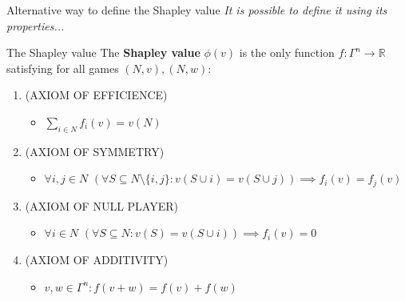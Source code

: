 \documentclass{beamer}
\begin{document}
\begin{frame}{Alternative way to define the Shapley value}
    \textit{It is possible to define it using its properties...}
    \begin{block}{The Shapley value}
       The \textbf{Shapley value} $\phi(v)$ is the only function $f \colon \Gamma^n \to \mathbb{R}$ satisfying for all games $(N,v),(N,w)$:
        \begin{enumerate}
            \item (AXIOM OF EFFICIENCE)
            \begin{itemize}
                \item $\sum_{i \in N}f_i(v) = v(N)$
            \end{itemize}
            \item (AXIOM OF SYMMETRY)
            \begin{itemize}
                \item $\forall i,j \in N$ $(\forall S \subseteq N \setminus \{i,j\}: v(S \cup i) = v(S \cup j)) \implies f_i(v) = f_j(v)$
            \end{itemize}
            \item (AXIOM OF NULL PLAYER)
            \begin{itemize}
                \item $\forall i \in N$ $(\forall S \subseteq N: v(S) = v(S \cup i)) \implies f_i(v)=0$
            \end{itemize}
            \item (AXIOM OF ADDITIVITY)
            \begin{itemize}
                \item $v,w \in \Gamma^n: f(v+w)=f(v)+f(w)$
            \end{itemize}
        \end{enumerate}
        
    \end{block}
\end{frame}


\end{document}
